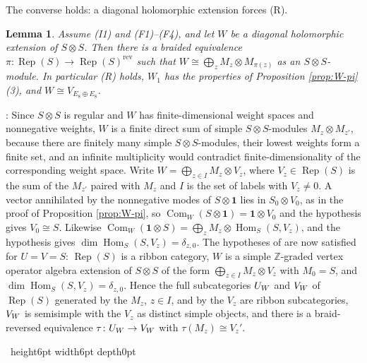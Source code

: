 \documentclass[leqno]{article}
\let\cal\relax
\newcommand{\cal}{\mathcal}
\newcommand{\Z}{\ensuremath{\mathbb{Z}}}
\newcommand{\qed}{\hfill \vrule height6pt  width6pt depth0pt}
\newcommand{\co}{\colon}
\newcommand{\ot}{\otimes}
\DeclareMathOperator{\Rep}{Rep}
\newtheorem{lemma}[thm]{Lemma}
\newenvironment{proof}[1][]{\noindent {\it Proof #1} : }{\hbox{~}\qed
\smallskip
}
\numberwithin{equation}{section}
\begin{document}
The converse holds: a diagonal holomorphic extension forces (R).

\begin{lemma}
\label{lem:extension-to-R}
Assume \textup{(I1)} and \textup{(F1)}--\textup{(F4)}, and let $W$ be a diagonal holomorphic extension of $S \ot S$. Then there is a braided equivalence $\pi \co \Rep(S) \to \Rep(S)^{\mathrm{rev}}$ such that $W \cong \bigoplus_z M_z \ot M_{\pi(z)}$ as an $S \ot S$-module. In particular \textup{(R)} holds, $W_1$ has the properties of Proposition \ref{prop:W-pi}(3), and $W \cong V_{E_8 \oplus E_8}$.
\end{lemma}

\begin{proof}
Since $S \ot S$ is regular and $W$ has finite-dimensional weight spaces and nonnegative weights, $W$ is a finite direct sum of simple $S \ot S$-modules $M_z \ot M_{z'}$, because there are finitely many simple $S\ot S$-modules, their lowest weights form a finite set, and an infinite multiplicity would contradict finite-dimensionality of the corresponding weight space. Write $W = \bigoplus_{z \in I} M_z \ot V_z$, where $V_z \in \Rep(S)$ is the sum of the $M_{z'}$ paired with $M_z$ and $I$ is the set of labels with $V_z \neq 0$. A vector annihilated by the nonnegative modes of $S \ot \mathbf 1$ lies in $S_0 \ot V_0$, as in the proof of Proposition \ref{prop:W-pi}, so $\operatorname{Com}_W(S \ot \mathbf 1) = \mathbf 1 \ot V_0$ and the hypothesis gives $V_0 \cong S$. Likewise $\operatorname{Com}_W(\mathbf 1 \ot S) = \bigoplus_z M_z \ot \operatorname{Hom}_S(S,V_z)$, and the hypothesis gives $\dim\operatorname{Hom}_S(S,V_z) = \delta_{z,0}$. The hypotheses of \cite[Theorem 5.10(2) p.~51]{CKM22} are now satisfied for $U = V = S$: $\Rep(S)$ is a ribbon category, $W$ is a simple $\Z$-graded vertex operator algebra extension of $S \ot S$ of the form $\bigoplus_{z \in I} M_z \ot V_z$ with $M_0 = S$, and $\dim\operatorname{Hom}_S(S,V_z) = \delta_{z,0}$. Hence the full subcategories $\cal U_W$ and $\cal V_W$ of $\Rep(S)$ generated by the $M_z$, $z \in I$, and by the $V_z$ are ribbon subcategories, $\cal V_W$ is semisimple with the $V_z$ as distinct simple objects, and there is a braid-reversed equivalence $\tau \co \cal U_W \to \cal V_W$ with $\tau(M_z) \cong V_z'$.


\end{proof}
\end{document}

